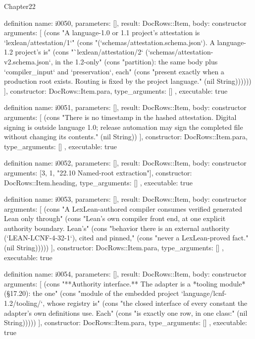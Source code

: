\begin{lexlean}{Chapter22}
\begin{semanticmodule}
definition{
  name: i0050,
  parameters: [],
  result: DocRows::Item,
  body: constructor{
    arguments: [
      (cons "A language-1.0 or 1.1 project's attestation is `lexlean/attestation/1`" (cons "(`schemas/attestation.schema.json`). A language-1.2 project's is" (cons "`lexlean/attestation/2` (`schemas/attestation-v2.schema.json`, in the 1.2-only" (cons "partition): the same body plus `compiler_input` and `preservation`, each" (cons "present exactly when a production root exists. Routing is fixed by the project language." (nil String))))))
    ],
    constructor: DocRows::Item.para,
    type_arguments: []
  },
  executable: true
}

definition{
  name: i0051,
  parameters: [],
  result: DocRows::Item,
  body: constructor{
    arguments: [
      (cons "There is no timestamp in the hashed attestation. Digital signing is outside language 1.0; release automation may sign the completed file without changing its contents." (nil String))
    ],
    constructor: DocRows::Item.para,
    type_arguments: []
  },
  executable: true
}

definition{
  name: i0052,
  parameters: [],
  result: DocRows::Item,
  body: constructor{
    arguments: [3, 1, "22.10 Named-root extraction"],
    constructor: DocRows::Item.heading,
    type_arguments: []
  },
  executable: true
}

definition{
  name: i0053,
  parameters: [],
  result: DocRows::Item,
  body: constructor{
    arguments: [
      (cons "A LexLean-authored compiler consumes verified generated Lean only through" (cons "Lean's own compiler front end, at one explicit authority boundary. Lean's" (cons "behavior there is an external authority (`LEAN-LCNF-4-32-1`), cited and pinned," (cons "never a LexLean-proved fact." (nil String)))))
    ],
    constructor: DocRows::Item.para,
    type_arguments: []
  },
  executable: true
}

definition{
  name: i0054,
  parameters: [],
  result: DocRows::Item,
  body: constructor{
    arguments: [
      (cons "**Authority interface.** The adapter is a *tooling module* (§17.20): the one" (cons "module of the embedded project `language/lcnf-1.2/tooling/`, whose registry is" (cons "the closed interface of every constant the adapter's own definitions use. Each" (cons "is exactly one row, in one class:" (nil String)))))
    ],
    constructor: DocRows::Item.para,
    type_arguments: []
  },
  executable: true
}


\end{semanticmodule}
\end{lexlean}
